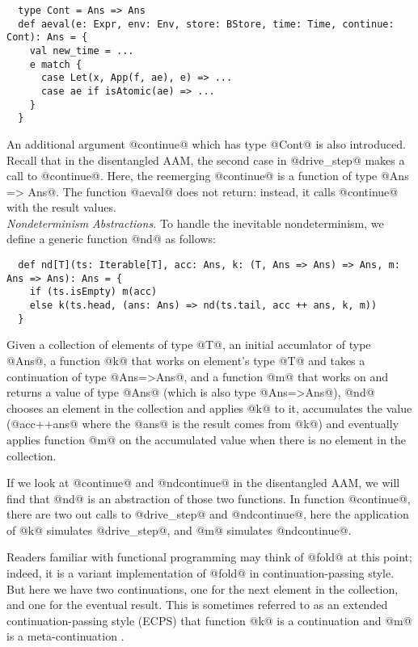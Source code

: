 \documentclass[acmsmall, review]{acmart}\settopmatter{}
\begin{document}
\begin{lstlisting}
  type Cont = Ans => Ans
  def aeval(e: Expr, env: Env, store: BStore, time: Time, continue: Cont): Ans = {
    val new_time = ...
    e match {
      case Let(x, App(f, ae), e) => ...
      case ae if isAtomic(ae) => ...
    }
  }
\end{lstlisting}

An additional argument @continue@ which has type @Cont@ is also introduced.
Recall that in the disentangled AAM, the second case in @drive_step@
makes a call to @continue@. Here, the reemerging @continue@ is a function
of type @Ans => Ans@. The function @aeval@ does not return: instead, it calls
@continue@ with the result values. \\

\textit{Nondeterminism Abstractions.}
To handle the inevitable nondeterminism, we define a generic function @nd@ as follows:

\begin{lstlisting}
  def nd[T](ts: Iterable[T], acc: Ans, k: (T, Ans => Ans) => Ans, m: Ans => Ans): Ans = {
    if (ts.isEmpty) m(acc)
    else k(ts.head, (ans: Ans) => nd(ts.tail, acc ++ ans, k, m))
  }
\end{lstlisting}

Given a collection of elements of type @T@, an initial accumlator of type 
@Ans@, a function @k@ that works on element's type @T@ and takes a continuation 
of type @Ans=>Ans@, and a function @m@ that works on and returns a value of type 
@Ans@ (which is also type @Ans=>Ans@), @nd@ chooses an element in the collection 
and applies @k@ to it, accumulates the value (@acc++ans@ where the @ans@ is the 
result comes from @k@) and eventually applies function @m@ on the accumulated 
value when there is no element in the collection.

If we look at @continue@ and @ndcontinue@ in the disentangled AAM, we will find
that @nd@ is an abstraction of those two functions. In function @continue@,
there are two out calls to @drive_step@ and @ndcontinue@, here the application
of @k@ simulates @drive_step@, and @m@ simulates @ndcontinue@.

Readers familiar with functional programming may think of @fold@ at this point; indeed,
it is a variant implementation of @fold@ in continuation-passing style. But here we have two
continuations, one for the next element in the collection, and one for the eventual result.
This is sometimes referred to as an extended continuation-passing style (ECPS)
that function @k@ is a continuation and @m@ is a meta-continuation 
\cite{Danvy:1990:AC:91556.91622}. \\
\end{document}
